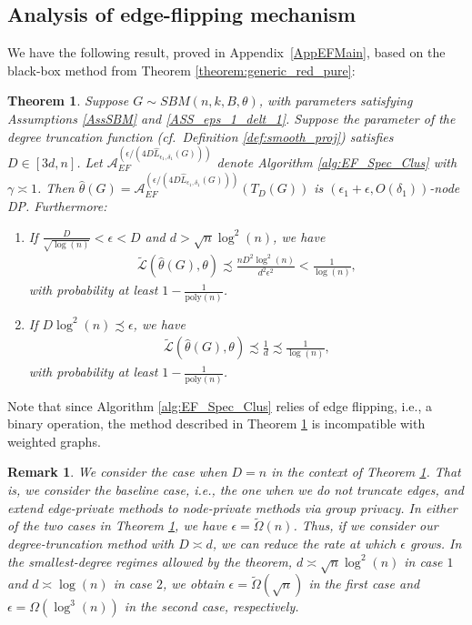 \documentclass{article}
\newtheorem{remark}{Remark}
\newtheorem{theorem}{Theorem}
\newcommand{\thetahat}{\ensuremath{\widehat{\theta}}}
\begin{document}

\subsection{Analysis of edge-flipping mechanism}
\label{SecEF}

We have the following result, proved in Appendix~\ref{AppEFMain}, based on the black-box method from Theorem \ref{theorem:generic_red_pure}:

\begin{theorem}
\label{theorem:Edge_Flip_Main_Thm}
Suppose $G \sim SBM(n, k, B, \theta)$, with parameters satisfying Assumptions \ref{AssSBM} and \ref{ASS_eps_1_delt_1}. Suppose the parameter of the degree truncation function (cf.\ Definition \ref{def:smooth_proj}) satisfies $D \in [3d, n]$. Let $\mathcal{A}_{EF}^{\left(\epsilon/(4D\hat{L}_{\epsilon_1, \delta_1}(G))\right)}$ denote Algorithm \ref{alg:EF_Spec_Clus} with $\gamma \asymp 1$. Then $\thetahat(G) = \mathcal{A}_{EF}^{\left(\epsilon/(4D\hat{L}_{\epsilon_1, \delta_1}(G))\right)}(T_{D}(G))$ is $(\epsilon_1 + \epsilon, O(\delta_1))$-node DP. Furthermore:
\begin{enumerate}
\item If $\frac{D}{\sqrt{\log(n)}} < \epsilon < D$ and $d > \sqrt{n}\log^2(n)$, we have
\begin{align*}
\widetilde{\mathcal{L}}\left(\thetahat(G), \theta\right) \precsim \frac{nD^2\log^2(n)}{d^2\epsilon^2} < \frac{1}{\log(n)},
\end{align*}
with probability at least $1 - \frac{1}{\mathrm{poly}(n)}$.
\item If $D\log^2(n) \precsim \epsilon$, we have
\begin{align*}
\widetilde{\mathcal{L}}\left(\thetahat(G), \theta\right) \precsim \frac{1}{d} \precsim \frac{1}{\log(n)},
\end{align*}
with probability at least $1 - \frac{1}{\mathrm{poly}(n)}$.
\end{enumerate}
\end{theorem}

Note that since Algorithm \ref{alg:EF_Spec_Clus} relies of edge flipping, i.e., a binary operation, the method described in Theorem \ref{theorem:Edge_Flip_Main_Thm} is incompatible with weighted graphs.

\begin{remark}
\label{remark:EF_D=n}
We consider the case when $D = n$ in the context of Theorem \ref{theorem:Edge_Flip_Main_Thm}. That is, we consider the baseline case, i.e., the one when we do not truncate edges, and extend edge-private methods to node-private methods via group privacy. In either of the two cases in Theorem \ref{theorem:Edge_Flip_Main_Thm}, we have $\epsilon = \widetilde{\Omega}(n)$. Thus, if we consider our degree-truncation method with $D \asymp d$, we can reduce the rate at which $\epsilon$ grows. In the smallest-degree regimes allowed by the theorem, $d \asymp \sqrt{n}\log^2(n)$ in case $1$ and $d \asymp \log(n)$ in case $2$, we obtain $\epsilon = \widetilde{\Omega}(\sqrt{n})$ in the first case and $\epsilon = \Omega(\log^3(n))$ in the second case, respectively.
\end{remark}
\end{document}
